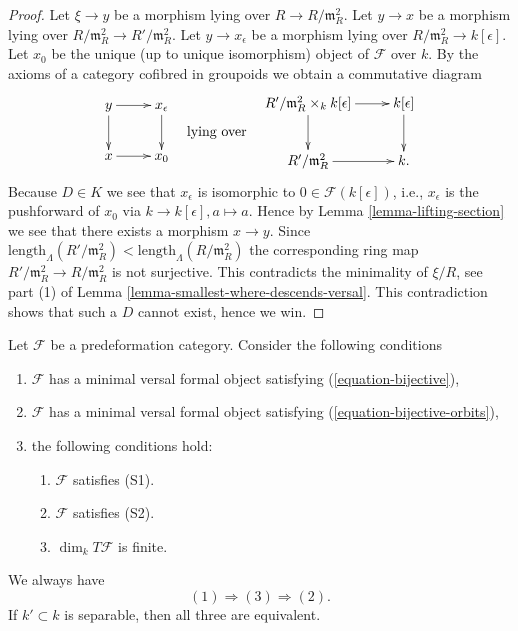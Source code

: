 \begin{proof}
\medskip\noindent
Let $\xi \to y$ be a morphism lying over $R \to R/\mathfrak m_R^2$.
Let $y \to x$ be a morphism lying over
$R/\mathfrak m_R^2 \to R'/\mathfrak m_R^2$.
Let $y \to x_\epsilon$ be a morphism lying over
$R/\mathfrak m_R^2 \to k[\epsilon]$. Let $x_0$ be the unique (up to unique
isomorphism) object of $\mathcal{F}$ over $k$.
By the axioms of a category cofibred in groupoids we obtain
a commutative diagram
$$
\vcenter{
\xymatrix{
y \ar[r] \ar[d] & x_\epsilon \ar[d] \\
x \ar[r]   & x_0
}
}
\quad\text{lying over}\quad
\vcenter{
\xymatrix{
R'/\mathfrak m_R^2 \times_k k[\epsilon] \ar[r] \ar[d] & k[\epsilon] \ar[d] \\
R'/\mathfrak m_R^2 \ar[r] & k.
}
}
$$
Because $D \in K$ we see that $x_\epsilon$ is isomorphic
to $0 \in \mathcal{F}(k[\epsilon])$, i.e., $x_\epsilon$ is
the pushforward of $x_0$ via $k \to k[\epsilon], a \mapsto a$.
Hence by
Lemma \ref{lemma-lifting-section}
we see that there exists a morphism $x \to y$. Since
$\text{length}_\Lambda(R'/\mathfrak m_R^2) <
\text{length}_\Lambda(R/\mathfrak m_R^2)$
the corresponding ring map $R'/\mathfrak m_R^2 \to R/\mathfrak m_R^2$
is not surjective. This contradicts the minimality of
$\xi/R$, see part (1) of
Lemma \ref{lemma-smallest-where-descends-versal}.
This contradiction shows that such a $D$ cannot exist, hence
we win.
\end{proof}

\begin{theorem}
\label{theorem-miniversal-object-existence}
Let $\mathcal{F}$ be a predeformation category.
Consider the following conditions
\begin{enumerate}
\item $\mathcal{F}$ has a minimal versal formal object satisfying
(\ref{equation-bijective}),
\item $\mathcal{F}$ has a minimal versal formal object satisfying
(\ref{equation-bijective-orbits}),
\item the following conditions hold:
\begin{enumerate}
\item $\mathcal{F}$ satisfies (S1).
\item $\mathcal{F}$ satisfies (S2).
\item $\dim_{k} T\mathcal{F}$ is finite.
\end{enumerate}
\end{enumerate}
We always have
$$
(1) \Rightarrow (3) \Rightarrow (2).
$$
If $k' \subset k$ is separable, then all three are equivalent.
\end{theorem}

